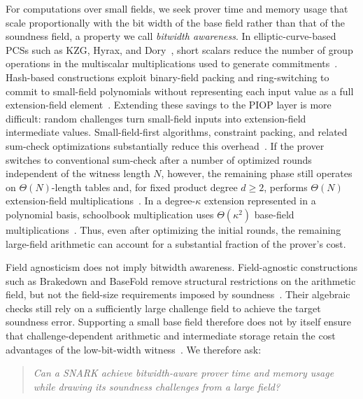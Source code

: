 For computations over small fields, we seek prover time and
memory usage that scale proportionally with the bit width of the base field
rather than that of the soundness field, a property we call
\emph{bitwidth awareness}.
In elliptic-curve-based PCSs such as KZG, Hyrax, and
Dory~\cite{asiacrypt/KateZG10,sp/WahbyTSTW18,tcc/Lee21},
short scalars reduce the number of group operations in the
multiscalar multiplications used to generate
commitments~\cite{eurocrypt/SettyTW24}.
Hash-based constructions exploit binary-field packing and
ring-switching to commit to small-field polynomials without
representing each input value as a full extension-field
element~\cite{eurocrypt/DiamondP25,eurocrypt/DiamondP26}.
Extending these savings to the PIOP layer is more difficult:
random challenges turn small-field inputs into extension-field
intermediate values.
Small-field-first algorithms, constraint packing, and related
sum-check optimizations substantially reduce this
overhead~\cite{iacr/BagadDT24,iacr/DaoT24,iacr/Gruen24,%
iacr/BagadDDT25,iacr/DaoDBDT26}.
If the prover switches to conventional sum-check after a number
of optimized rounds independent of the witness length \(N\),
however, the remaining phase still operates on
\(\Theta(N)\)-length tables and, for fixed product degree
\(d\geq 2\), performs \(\Theta(N)\) extension-field
multiplications~\cite{crypto/Thaler13,iacr/BagadDT24}.
In a degree-\(\kappa\) extension represented in a polynomial basis,
schoolbook multiplication uses \(\Theta(\kappa^2)\) base-field
multiplications~\cite{iacr/BagadDT24}.
Thus, even after optimizing the initial rounds, the remaining
large-field arithmetic can account for a substantial fraction
of the prover's cost.

Field agnosticism does not imply bitwidth awareness.
Field-agnostic constructions such as Brakedown and BaseFold
remove structural restrictions on the arithmetic field, but not
the field-size requirements imposed by
soundness~\cite{crypto/GolovnevLSTW23,crypto/ZeilbergerCF24}.
Their algebraic checks still rely on a sufficiently large
challenge field to achieve the target soundness error.
Supporting a small base field therefore does not by itself
ensure that challenge-dependent arithmetic and intermediate
storage retain the cost advantages of the low-bit-width witness~\cite{eurocrypt/DiamondP26,iacr/BagadDDT25}.
We therefore ask:
\begin{quote}
\emph{Can a SNARK achieve bitwidth-aware prover time and memory
usage while drawing its soundness challenges from a large field?}
\end{quote}

